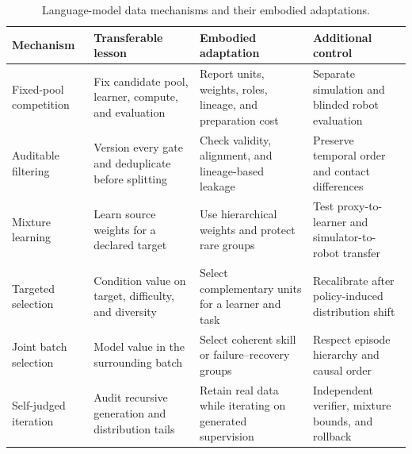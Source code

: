 \begin{table}[t]
\centering
\caption{Language-model data mechanisms and their embodied adaptations.}
\label{tab:llm-lessons}
\scriptsize
\setlength{\tabcolsep}{4pt}
\renewcommand{\arraystretch}{1.08}
\begin{tabularx}{\textwidth}{@{}p{3.1cm}p{4.1cm}p{4.6cm}X@{}}
\toprule
Mechanism & Transferable lesson & Embodied adaptation & Additional control \\
\midrule
Fixed-pool competition~\cite{li2024datacomp_2406_11794,gadre2023datacomp_2304_14108}
& Fix candidate pool, learner, compute, and evaluation
& Report units, weights, roles, lineage, and preparation cost
& Separate simulation and blinded robot evaluation \\
Auditable filtering~\cite{penedo2023refinedweb_2306_01116,penedo2024fineweb_2406_17557}
& Version every gate and deduplicate before splitting
& Check validity, alignment, and lineage-based leakage
& Preserve temporal order and contact differences \\
Mixture learning~\cite{xie2023doremi_2305_10429,xie2023data_2302_03169}
& Learn source weights for a declared target
& Use hierarchical weights and protect rare groups
& Test proxy-to-learner and simulator-to-robot transfer \\
Targeted selection~\cite{xia2024less_2402_04333,liu2023what_2312_15685}
& Condition value on target, difficulty, and diversity
& Select complementary units for a learner and task
& Recalibrate after policy-induced distribution shift \\
Joint batch selection~\cite{evans2024data_2406_17711}
& Model value in the surrounding batch
& Select coherent skill or failure--recovery groups
& Respect episode hierarchy and causal order \\
Self-judged iteration~\cite{yuan2024self_2401_10020,shumailov2024collapse}
& Audit recursive generation and distribution tails
& Retain real data while iterating on generated supervision
& Independent verifier, mixture bounds, and rollback \\
\bottomrule
\end{tabularx}
\end{table}

